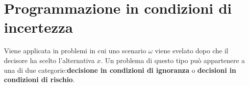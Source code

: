 \documentclass[\main/main.tex]{subfiles}
\begin{document}
\chapter{Programmazione in condizioni di incertezza}
Viene applicata in problemi in cui uno scenario $\omega$ viene svelato dopo che il decisore ha scelto l'alternativa $x$. Un problema di questo tipo può appartenere a una di due categorie:\textbf{decisione in condizioni di ignoranza} o \textbf{decisioni in condizioni di rischio}.
\end{document}
